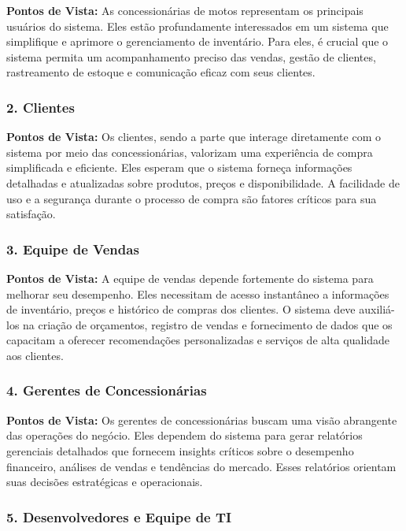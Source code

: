 \textbf{Pontos de Vista:} As concessionárias de motos representam os principais usuários do sistema. Eles estão profundamente interessados em um sistema que simplifique e aprimore o gerenciamento de inventário. Para eles, é crucial que o sistema permita um acompanhamento preciso das vendas, gestão de clientes, rastreamento de estoque e comunicação eficaz com seus clientes.

\subsubsection{2. Clientes}

\textbf{Pontos de Vista:} Os clientes, sendo a parte que interage diretamente com o sistema por meio das concessionárias, valorizam uma experiência de compra simplificada e eficiente. Eles esperam que o sistema forneça informações detalhadas e atualizadas sobre produtos, preços e disponibilidade. A facilidade de uso e a segurança durante o processo de compra são fatores críticos para sua satisfação.

\subsubsection{3. Equipe de Vendas}

\textbf{Pontos de Vista:} A equipe de vendas depende fortemente do sistema para melhorar seu desempenho. Eles necessitam de acesso instantâneo a informações de inventário, preços e histórico de compras dos clientes. O sistema deve auxiliá-los na criação de orçamentos, registro de vendas e fornecimento de dados que os capacitam a oferecer recomendações personalizadas e serviços de alta qualidade aos clientes.

\subsubsection{4. Gerentes de Concessionárias}

\textbf{Pontos de Vista:} Os gerentes de concessionárias buscam uma visão abrangente das operações do negócio. Eles dependem do sistema para gerar relatórios gerenciais detalhados que fornecem insights críticos sobre o desempenho financeiro, análises de vendas e tendências do mercado. Esses relatórios orientam suas decisões estratégicas e operacionais.

\subsubsection{5. Desenvolvedores e Equipe de TI}

